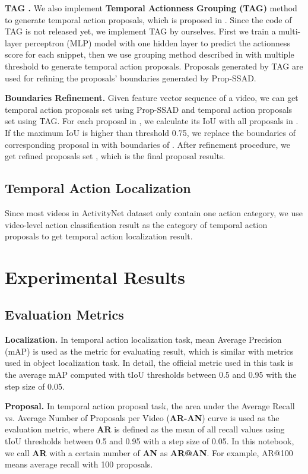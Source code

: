 \documentclass[10pt,twocolumn,letterpaper]{article}
\begin{document}
{\bf TAG \cite{xiong2017pursuit}.} We also implement {\bf Temporal Actionness Grouping (TAG)} method to generate temporal action proposals, which is proposed in \cite{xiong2017pursuit}. Since the code of TAG is not released yet, we implement TAG by ourselves. First we train a multi-layer perceptron (MLP) model with one hidden layer to predict the actionness score for each snippet, then we use grouping method described in \cite{xiong2017pursuit} with multiple threshold to generate temporal action proposals. Proposals generated by TAG are used for refining the proposals' boundaries generated by Prop-SSAD.

{\bf Boundaries Refinement.} Given feature vector sequence of a video, we can get  temporal action proposals set  using Prop-SSAD and temporal action proposals set  using TAG. For each proposal  in , we calculate its IoU with all proposals in . If the maximum IoU is higher than threshold 0.75, we replace the boundaries of corresponding proposal  in  with boundaries of . After refinement procedure, we get refined proposals set , which is the final proposal results.


\subsection{Temporal Action Localization}

Since most videos in ActivityNet dataset only contain one action category, we use video-level action classification result as the category of temporal action proposals to get temporal action localization result.

\section{Experimental Results}



\subsection{Evaluation Metrics}

{\bf Localization.} In temporal action localization task, mean Average Precision (mAP) is used as the metric for evaluating result, which is similar with metrics used in object localization task. In detail, the official metric used in this task is the average mAP computed with tIoU thresholds  between 0.5 and 0.95 with the step size of 0.05.

{\bf Proposal.} In temporal action proposal task,  the area under the Average Recall vs. Average Number of Proposals per Video ({\bf AR-AN}) curve is used as the evaluation metric, where {\bf AR} is defined as the mean of all recall values using tIoU thresholds between 0.5 and 0.95 with a step size of 0.05. In this notebook, we call {\bf AR} with a certain number of  {\bf AN} as {\bf AR@AN}. For example, AR@100 means average recall with 100 proposals.
\end{document}

